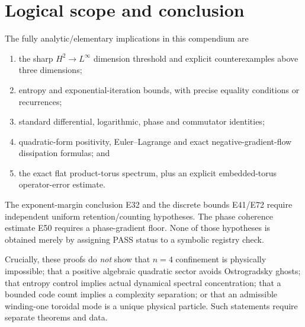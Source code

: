 \documentclass[11pt,letterpaper]{article}
\theoremstyle{definition}
\theoremstyle{remark}
\begin{document}
\section{Logical scope and conclusion}
The fully analytic/elementary implications in this compendium are
\begin{enumerate}[label=(\roman*)]
\item the sharp $H^2\to L^\infty$ dimension threshold and explicit
counterexamples above three dimensions;
\item entropy and exponential-iteration bounds, with precise equality
conditions or recurrences;
\item standard differential, logarithmic, phase and commutator identities;
\item quadratic-form positivity, Euler--Lagrange and exact
negative-gradient-flow dissipation formulas; and
\item the exact flat product-torus spectrum, plus an explicit
embedded-torus operator-error estimate.
\end{enumerate}
The exponent-margin conclusion E32 and the discrete bounds E41/E72
require independent uniform retention/counting hypotheses. The phase
coherence estimate E50 requires a phase-gradient floor. None of those
hypotheses is obtained merely by assigning PASS status to a symbolic
registry check.

Crucially, these proofs do \emph{not} show that $n=4$ confinement is
physically impossible; that a positive algebraic quadratic sector avoids
Ostrogradsky ghosts; that entropy control implies actual dynamical
spectral concentration; that a bounded code count implies a complexity
separation; or that an admissible winding-one toroidal mode is a unique
physical particle. Such statements require separate theorems and data.
\end{document}
